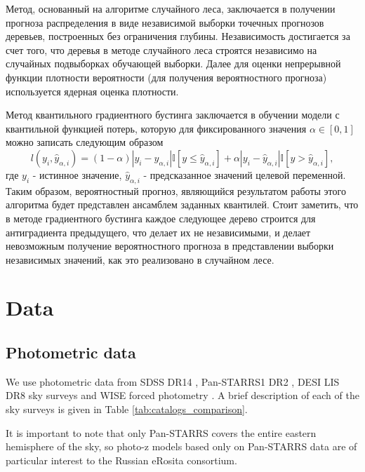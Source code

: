 \documentclass[fleqn,usenatbib]{mnras}
\begin{document}
Метод, основанный на алгоритме случайного леса, заключается в получении прогноза распределения в виде независимой выборки точечных прогнозов деревьев, построенных без ограничения глубины. Независимость достигается за счет того, что деревья в методе случайного леса строятся независимо на случайных подвыборках обучающей выборки. Далее для оценки непрерывной функции плотности вероятности (для получения вероятностного прогноза) используется ядерная оценка плотности.

Метод квантильного градиентного бустинга заключается в обучении модели с квантильной функцией потерь, которую для фиксированного значения \(\alpha \in [0,1]\) можно записать следующим образом
\begin{equation}
    l(y_i, \hat{y}_{\alpha, i}) = (1-\alpha)|y_i - \hat{y}_{\alpha, i}|\mathbb{I}[y \leq \hat{y}_{\alpha, i}] + \alpha|y_i - \hat{y}_{\alpha, i}|\mathbb{I}[y > \hat{y}_{\alpha, i}],
\end{equation}
где \(y_i\) - истинное значение, \(\hat{y}_{\alpha, i}\) - предсказанное значений целевой переменной. Таким образом, вероятностный прогноз, являющийся результатом работы этого алгоритма будет представлен ансамблем заданных квантилей. Стоит заметить, что в методе градиентного бустинга каждое следующее дерево строится для антиградиента предыдущего, что делает их не независимыми, и делает невозможным получение вероятностного прогноза в представлении выборки независимых значений, как это реализовано в случайном лесе.


\section{Data}
\subsection{Photometric data}
We use photometric data from SDSS DR14 \citep{2018ApJS..235...42A}, Pan-STARRS1 DR2 \citep{2018AAS...23110201C}, DESI LIS DR8 \citep{2019AJ....157..168D} sky surveys and WISE forced photometry \citep{2010AJ....140.1868W}. A brief description of each of the sky surveys is given in Table \ref{tab:catalogs_comparison}.

It is important to note that only Pan-STARRS covers the entire eastern hemisphere of the sky, so photo-z models based only on Pan-STARRS data are of particular interest to the Russian eRosita consortium.
\end{document}
